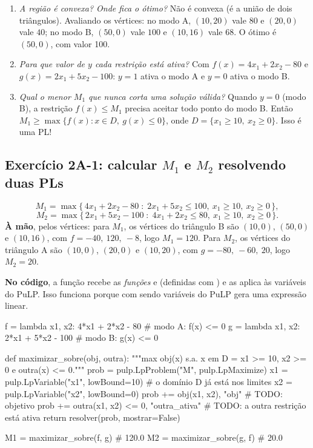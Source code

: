 \begin{discussao}
\begin{enumerate}
  \item \emph{A região é convexa? Onde fica o ótimo?} Não é convexa (é a união de dois triângulos). Avaliando os
  vértices: no modo A, $(10,20)$ vale $80$ e $(20,0)$ vale $40$; no modo B, $(50,0)$ vale $100$ e $(10,16)$ vale $68$.
  O ótimo é $(50,0)$, com valor 100.
  \item \emph{Para que valor de $y$ cada restrição está ativa?} Com $f(x)=4x_1+2x_2-80$ e
  $g(x)=2x_1+5x_2-100$: $y=1$ ativa o modo A e $y=0$ ativa o modo B.
  \item \emph{Qual o menor $M_1$ que nunca corta uma solução válida?} Quando $y=0$ (modo B), a restrição
  $f(x)\le M_1$ precisa aceitar todo ponto do modo B. Então $M_1\ge\max\{f(x): x\in D,\ g(x)\le0\}$, onde
  $D=\{x_1\ge10,\ x_2\ge0\}$. Isso é uma PL!
\end{enumerate}
\end{discussao}

\subsection*{Exercício 2A-1: calcular $M_1$ e $M_2$ resolvendo duas PLs}

\[
M_1 = \max\{\,4x_1+2x_2-80 \;:\; 2x_1+5x_2\le100,\ x_1\ge10,\ x_2\ge0\,\},
\]
\[
M_2 = \max\{\,2x_1+5x_2-100 \;:\; 4x_1+2x_2\le80,\ x_1\ge10,\ x_2\ge0\,\}.
\]
\textbf{À mão}, pelos vértices: para $M_1$, os vértices do triângulo B são $(10,0)$, $(50,0)$ e $(10,16)$, com
$f=-40,\ 120,\ -8$, logo $M_1=120$. Para $M_2$, os vértices do triângulo A são $(10,0)$, $(20,0)$ e $(10,20)$, com
$g=-80,\ -60,\ 20$, logo $M_2=20$.

\textbf{No código}, a função recebe as \emph{funções}  e  (definidas com ) e as aplica às
variáveis do PuLP. Isso funciona porque  com  sendo variáveis do PuLP gera uma
expressão linear.

\begin{codigo}
f = lambda x1, x2: 4*x1 + 2*x2 - 80     # modo A:  f(x) <= 0
g = lambda x1, x2: 2*x1 + 5*x2 - 100    # modo B:  g(x) <= 0

def maximizar_sobre(obj, outra):
    """max obj(x)  s.a.  x em D = {x1 >= 10, x2 >= 0}  e  outra(x) <= 0."""
    prob = pulp.LpProblem("M", pulp.LpMaximize)
    x1 = pulp.LpVariable("x1", lowBound=10)    # o domínio D já está nos limites
    x2 = pulp.LpVariable("x2", lowBound=0)
    prob += obj(x1, x2), "obj"                 # TODO: objetivo
    prob += outra(x1, x2) <= 0, "outra_ativa"  # TODO: a outra restrição está ativa
    return resolver(prob, mostrar=False)

M1 = maximizar_sobre(f, g)     # 120.0
M2 = maximizar_sobre(g, f)     # 20.0
\end{codigo}

